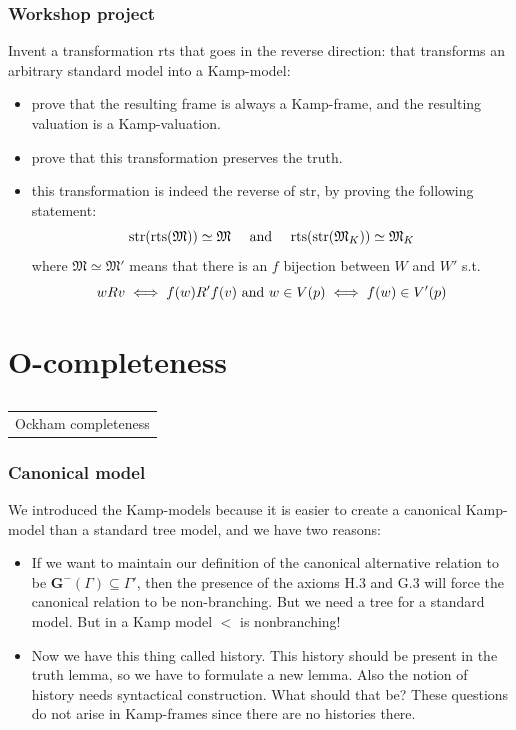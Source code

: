 \documentclass[xcolor=x11names]{beamer}
\makeatletter
\let\beamer@writeslidentry@miniframeson=\beamer@writeslidentry
\def\beamer@writeslidentry@miniframesoff{%
  \expandafter\beamer@ifempty\expandafter{\beamer@framestartpage}{}%
  {%
    \clearpage\beamer@notesactions%
  }
}
\newcommand*{\miniframeson}{\let\beamer@writeslidentry=\beamer@writeslidentry@miniframeson}
\newcommand*{\miniframesoff}{\let\beamer@writeslidentry=\beamer@writeslidentry@miniframesoff}
\newcommand{\cimdia}[1] {\miniframesoff \begin{frame}\begin{center}\huge \begin{tabular}{c}#1\end{tabular}\end{center}\end{frame}\miniframeson}
\newcommand{\szakasz}[2][]{\section{#1}\subsection{}\cimdia{#2}}
\newcommand{\FB}{\mathbf G}
\makeatother
\begin{document}
\begin{frame}[t]
	\frametitle{Workshop project}

Invent a transformation $\mathrm{rts}$ that goes in the reverse direction: that transforms an arbitrary standard model into a Kamp-model:
\begin{itemize}
\item prove that the resulting frame is always a Kamp-frame, and the resulting valuation is a Kamp-valuation.
\item prove that this transformation preserves the truth.
\item this transformation is indeed the reverse of $\mathrm{str}$, by proving the following statement:
\[ \mathrm{str}(\mathrm{rts}(\mathfrak M)) \simeq \mathfrak M \quad \textup{ and } \quad \mathrm{rts}(\mathrm{str}(\mathfrak M_K))\simeq \mathfrak M_K \]
where $\mathfrak M \simeq\mathfrak M' $ means that there is an $f$ bijection between $W$ and $W'$ s.t.
\[ wRv \iff f(w)R'f(v) \textup{ and } w \in V(p) \iff f(w)\in V'(p)\]
\end{itemize}

\end{frame}


\szakasz[O-completeness]{Ockham completeness}

\begin{frame}[t]
	\frametitle{Canonical model}
We introduced the Kamp-models because it is easier to create a canonical Kamp-model than a standard tree model, and we have two reasons:
 \begin{itemize}
 \item If we want to maintain our definition of the canonical alternative relation to be $\FB^-(\Gamma)\subseteq \Gamma'$, then the presence of the axioms H.3 and G.3 will force the canonical relation to be non-branching. But we need a tree for a standard model. But in a Kamp model $<$ is nonbranching!
 \item %
     Now we have this thing called history. This history should be present in the truth lemma, so we have to formulate a new lemma. Also the notion of history needs syntactical construction. What should that be? These questions do not arise in Kamp-frames since there are no histories there.
\end{itemize}
\end{frame}
\end{document}

